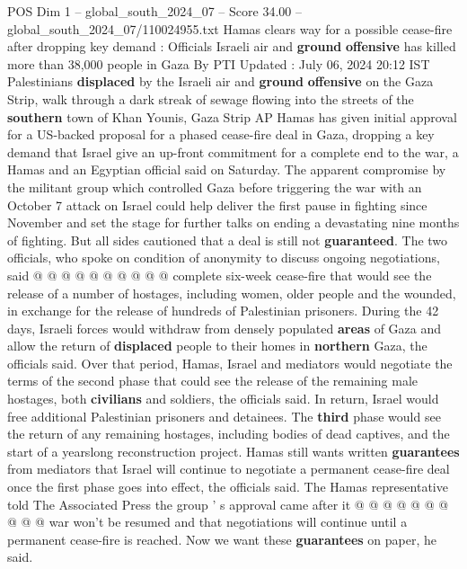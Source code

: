\begin{textsample}{POS Dim 1 – global\_south\_2024\_07 – Score 34.00 – global\_south\_2024\_07/110024955.txt}  \label{ex:f1_pos_171}
Hamas clears way for a possible cease-fire after dropping key demand : Officials Israeli air and \textbf{ground} \textbf{offensive} has killed more than 38,000 people in Gaza By PTI Updated : July 06, 2024 20:12 IST Palestinians \textbf{displaced} by the Israeli air and \textbf{ground} \textbf{offensive} on the Gaza Strip, walk through a dark streak of sewage flowing into the streets of the \textbf{southern} town of Khan Younis, Gaza Strip AP Hamas has given initial approval for a US-backed proposal for a phased cease-fire deal in Gaza, dropping a key demand that Israel give an up-front commitment for a complete end to the war, a Hamas and an Egyptian official said on Saturday.
The apparent compromise by the militant group which controlled Gaza before triggering the war with an October 7 attack on Israel could help deliver the first pause in fighting since November and set the stage for further talks on ending a devastating nine months of fighting.
But all sides cautioned that a deal is still not \textbf{guaranteed}.
The two officials, who spoke on condition of anonymity to discuss ongoing negotiations, said @ @ @ @ @ @ @ @ @ @ complete six-week cease-fire that would see the release of a number of hostages, including women, older people and the wounded, in exchange for the release of hundreds of Palestinian prisoners.
During the 42 days, Israeli forces would withdraw from densely populated \textbf{areas} of Gaza and allow the return of \textbf{displaced} people to their homes in \textbf{northern} Gaza, the officials said.
Over that period, Hamas, Israel and mediators would negotiate the terms of the second phase that could see the release of the remaining male hostages, both \textbf{civilians} and soldiers, the officials said.
In return, Israel would free additional Palestinian prisoners and detainees.
The \textbf{third} phase would see the return of any remaining hostages, including bodies of dead captives, and the start of a yearslong reconstruction project.
Hamas still wants written \textbf{guarantees} from mediators that Israel will continue to negotiate a permanent cease-fire deal once the first phase goes into effect, the officials said.
The Hamas representative told The Associated Press the group ' s approval came after it @ @ @ @ @ @ @ @ @ @ war won't be resumed and that negotiations will continue until a permanent cease-fire is reached.
Now we want these \textbf{guarantees} on paper, he said.

\end{textsample}
